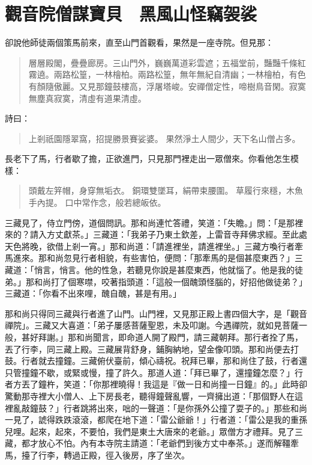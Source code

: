 
\chapter{觀音院僧謀寶貝　黑風山怪竊袈裟}

卻說他師徒兩個策馬前來，直至山門首觀看，果然是一座寺院。但見那：
\begin{quote}
層層殿閣，疊疊廊房。三山門外，巍巍萬道彩雲遮；五福堂前，豔豔千條紅霧遶。兩路松篁，一林檜柏。兩路松篁，無年無紀自清幽；一林檜柏，有色有顏隨傲麗。又見那鐘鼓樓高，浮屠塔峻。安禪僧定性，啼樹鳥音閑。寂寞無塵真寂寞，清虛有道果清虛。
\end{quote}

詩曰：
\begin{quote}
上剎祇園隱翠窩，招提勝景賽娑婆。
果然淨土人間少，天下名山僧占多。
\end{quote}

長老下了馬，行者歇了擔，正欲進門，只見那門裡走出一眾僧來。你看他怎生模樣：
\begin{quote}
頭戴左笄帽，身穿無垢衣。
銅環雙墜耳，絹帶束腰圍。
草履行來穩，木魚手內提。
口中常作念，般若總皈依。
\end{quote}

三藏見了，侍立門傍，道個問訊。那和尚連忙答禮，笑道：「失瞻。」問：「是那裡來的？請入方丈獻茶。」三藏道：「我弟子乃東土欽差，上雷音寺拜佛求經。至此處天色將晚，欲借上剎一宵。」那和尚道：「請進裡坐，請進裡坐。」三藏方喚行者牽馬進來。那和尚忽見行者相貌，有些害怕，便問：「那牽馬的是個甚麼東西？」三藏道：「悄言，悄言。他的性急，若聽見你說是甚麼東西，他就惱了。他是我的徒弟。」那和尚打了個寒噤，咬著指頭道：「這般一個醜頭怪腦的，好招他做徒弟？」三藏道：「你看不出來哩，醜自醜，甚是有用。」

那和尚只得同三藏與行者進了山門。山門裡，又見那正殿上書四個大字，是「觀音禪院」。三藏又大喜道：「弟子屢感菩薩聖恩，未及叩謝。今遇禪院，就如見菩薩一般，甚好拜謝。」那和尚聞言，即命道人開了殿門，請三藏朝拜。那行者拴了馬，丟了行李，同三藏上殿。三藏展背舒身，鋪胸納地，望金像叩頭。那和尚便去打鼓。行者就去撞鐘。三藏俯伏臺前，傾心禱祝。祝拜已畢，那和尚住了鼓，行者還只管撞鐘不歇，或緊或慢，撞了許久。那道人道：「拜已畢了，還撞鐘怎麼？」行者方丟了鐘杵，笑道：「你那裡曉得！我這是『做一日和尚撞一日鐘』的。」此時卻驚動那寺裡大小僧人、上下房長老，聽得鐘聲亂響，一齊擁出道：「那個野人在這裡亂敲鐘鼓？」行者跳將出來，咄的一聲道：「是你孫外公撞了耍子的。」那些和尚一見了，諕得跌跌滾滾，都爬在地下道：「雷公爺爺！」行者道：「雷公是我的重孫兒哩。起來，起來，不要怕，我們是東土大唐來的老爺。」眾僧方才禮拜。見了三藏，都才放心不怕。內有本寺院主請道：「老爺們到後方丈中奉茶。」遂而解韁牽馬，擡了行李，轉過正殿，徑入後房，序了坐次。

